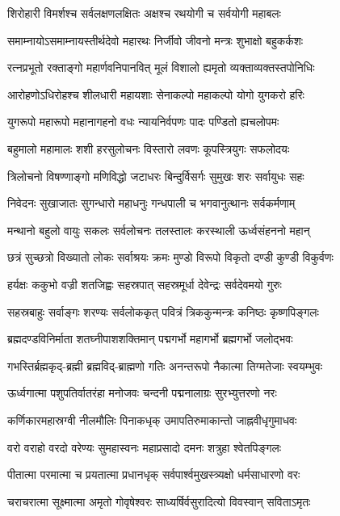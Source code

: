 \twolineshloka
{शिरोहारी विमर्शश्च सर्वलक्षणलक्षितः}%
{अक्षश्च रथयोगी च सर्वयोगी महाबलः}%

\twolineshloka
{समाम्नायोऽसमाम्नायस्तीर्थदेवो महारथः}%
{निर्जीवो जीवनो मन्त्रः शुभाक्षो बहुकर्कशः}%

\twolineshloka
{रत्नप्रभूतो रक्ताङ्गो महार्णवनिपानवित्}%
{मूलं विशालो ह्यमृतो व्यक्ताव्यक्तस्तपोनिधिः}%

\twolineshloka
{आरोहणोऽधिरोहश्च शीलधारी महायशाः}%
{सेनाकल्पो महाकल्पो योगो युगकरो हरिः}%

\twolineshloka
{युगरूपो महारूपो महानागहनो वधः}%
{न्यायनिर्वपणः पादः पण्डितो ह्यचलोपमः}%

\twolineshloka
{बहुमालो महामालः शशी हरसुलोचनः}%
{विस्तारो लवणः कूपस्त्रियुगः सफलोदयः}%

\twolineshloka
{त्रिलोचनो विषण्णाङ्गो मणिविद्धो जटाधरः}%
{बिन्दुर्विसर्गः सुमुखः शरः सर्वायुधः सहः}%

\twolineshloka
{निवेदनः सुखाजातः सुगन्धारो महाधनुः}%
{गन्धपाली च भगवानुत्थानः सर्वकर्मणाम्}%

\twolineshloka
{मन्थानो बहुलो वायुः सकलः सर्वलोचनः}%
{तलस्तालः करस्थाली ऊर्ध्वसंहननो महान्}%

\twolineshloka
{छत्रं सुच्छत्रो विख्यातो लोकः सर्वाश्रयः क्रमः}%
{मुण्डो विरूपो विकृतो दण्डी कुण्डी विकुर्वणः}%

\twolineshloka
{हर्यक्षः ककुभो वज्री शतजिह्वः सहस्रपात्}%
{सहस्रमूर्धा देवेन्द्रः सर्वदेवमयो गुरुः}%

\twolineshloka
{सहस्रबाहुः सर्वाङ्गः शरण्यः सर्वलोककृत्}%
{पवित्रं त्रिककुन्मन्त्रः कनिष्ठः कृष्णपिङ्गलः}%

\twolineshloka
{ब्रह्मदण्डविनिर्माता शतघ्नीपाशशक्तिमान्}%
{पद्मगर्भो महागर्भो ब्रह्मगर्भो जलोद्भवः}%

\twolineshloka
{गभस्तिर्ब्रह्मकृद्-ब्रह्मी ब्रह्मविद्-ब्राह्मणो गतिः}%
{अनन्तरूपो नैकात्मा तिग्मतेजाः स्वयम्भुवः}%

\twolineshloka
{ऊर्ध्वगात्मा पशुपतिर्वातरंहा मनोजवः}%
{चन्दनी पद्मनालाग्रः सुरभ्युत्तरणो नरः}%

\twolineshloka
{कर्णिकारमहास्रग्वी नीलमौलिः पिनाकधृक्}%
{उमापतिरुमाकान्तो जाह्नवीधृगुमाधवः}%

\twolineshloka
{वरो वराहो वरदो वरेण्यः सुमहास्वनः}%
{महाप्रसादो दमनः शत्रुहा श्वेतपिङ्गलः}%

\twolineshloka
{पीतात्मा परमात्मा च प्रयतात्मा प्रधानधृक्}%
{सर्वपार्श्वमुखस्त्र्यक्षो धर्मसाधारणो वरः}%

\twolineshloka
{चराचरात्मा सूक्ष्मात्मा अमृतो गोवृषेश्वरः}%
{साध्यर्षिर्वसुरादित्यो विवस्वान् सविताऽमृतः}%

